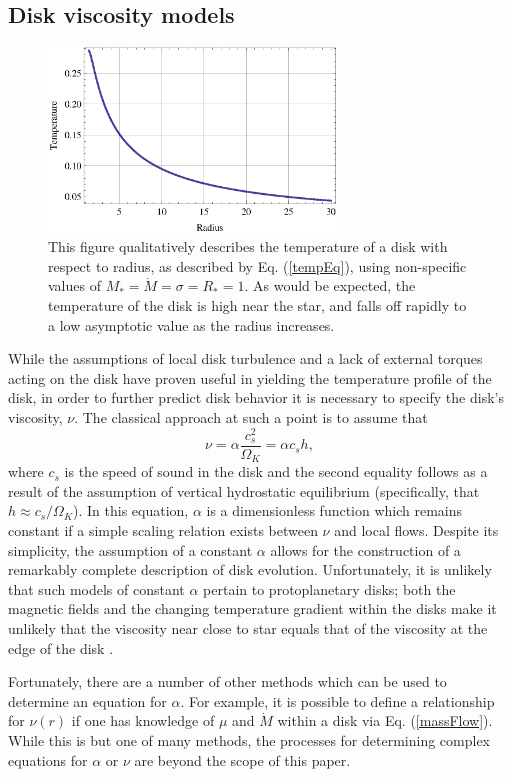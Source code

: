 \documentclass[aps,pra, twocolumn]{revtex4-1}
\begin{document}
\subsection{\label{section2.3} Disk viscosity models}
\begin{figure} [b!]
	\includegraphics[width=3in]{temperature.eps}
	\caption{This figure qualitatively describes the temperature of a disk with respect to radius, as described by Eq. (\ref{tempEq}), using non-specific values of $M_* = \dot{M} = \sigma = R_* = 1$.  As would be expected, the temperature of the disk is high near the star, and falls off rapidly to a low asymptotic value as the radius increases. \label{tempFig}}
\end{figure}
While the assumptions of local disk turbulence and a lack of external torques acting on the disk have proven useful in yielding the temperature profile of the disk, in order to further predict disk behavior it is necessary to specify the disk's viscosity, $\nu$.  The classical approach at such a point is to assume that
\begin{equation}
\nu = \alpha \frac{c_s^2}{\Omega_K} = \alpha c_s h , \label{nuRelation}
\end{equation}
where $c_s$ is the speed of sound in the disk and the second equality follows as a result of the assumption of vertical hydrostatic equilibrium (specifically, that $h \approx c_s/\Omega_K$).  In this equation, $\alpha$ is a dimensionless function which remains constant if a simple scaling relation exists between $\nu$ and local flows.  Despite its simplicity, the assumption of a constant $\alpha$ allows for the construction of a remarkably complete description of disk evolution.  Unfortunately, it is unlikely that such models of constant $\alpha$ pertain to protoplanetary disks; both the magnetic fields and the changing temperature gradient within the disks make it unlikely that the viscosity near close to star equals that of the viscosity at the edge of the disk \cite{armitage2011}.

Fortunately, there are a number of other methods which can be used to determine an equation for $\alpha$.  For example, it is possible to define a relationship for $\nu(r)$ if one has knowledge of $\mu$ and $\dot{M}$ within a disk via Eq. (\ref{massFlow}).  While this is but one of many methods, the processes for determining complex equations for $\alpha$ or $\nu$ are beyond the scope of this paper.
\end{document}
